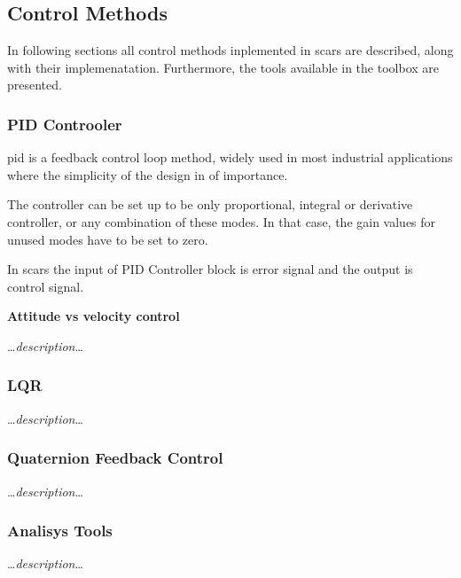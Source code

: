 \subsection{Control Methods}\label{sec:control}
    In following sections all control methods inplemented in \ac{scars} are described, along with their implemenatation. Furthermore, the tools available in the toolbox are presented. 
    
    \subsubsection{PID Controoler}
        \ac{pid} is a feedback control loop method, widely used in most industrial applications where the simplicity of the design in of importance. 
        
        

        The controller can be set up to be only proportional, integral or derivative controller, or any combination of these modes. In that case, the gain values for unused modes have to be set to zero.

        In \ac{scars} the input of PID Controller block is error signal and the output is control signal.
        
        \textbf{Attitude vs velocity control}

            \dots\textit{description}\dots
    
    \subsubsection{LQR}\label{sec:lqr}
        \dots\textit{description}\dots

    \subsubsection{Quaternion Feedback Control}
        \dots\textit{description}\dots
    
    \subsubsection{Analisys Tools}
        \dots\textit{description}\dots